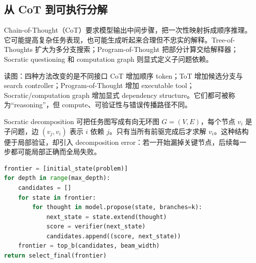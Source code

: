 \subsection{从 CoT 到可执行分解}

Chain-of-Thought（CoT）要求模型输出中间步骤，把一次性映射拆成顺序推理。它可能提高复杂任务表现，也可能生成听起来合理但不忠实的解释。Tree-of-Thoughts 扩大为多分支搜索；Program-of-Thought 把部分计算交给解释器；Socratic questioning 和 computation graph 则显式定义子问题依赖。





\begin{knowledgebox}{读图：四种方法改变的是不同接口}
CoT 增加顺序 token；ToT 增加候选分支与 search controller；Program-of-Thought 增加 executable tool；Socratic/computation graph 增加显式 dependency structure。它们都可被称为“reasoning”，但 compute、可验证性与错误传播路径不同。
\end{knowledgebox}

Socratic decomposition 可把任务图写成有向无环图 $G=(V,E)$，每个节点 $v_i$ 是子问题，边 $(v_j,v_i)$ 表示 $i$ 依赖 $j$。只有当所有前驱完成后才求解 $v_i$。这种结构便于局部验证，却引入 decomposition error：若一开始漏掉关键节点，后续每一步都可能局部正确而全局失败。




\begin{lstlisting}[language=Python,caption={带 verifier 的结构化推理搜索伪代码}]
frontier = [initial_state(problem)]
for depth in range(max_depth):
    candidates = []
    for state in frontier:
        for thought in model.propose(state, branches=k):
            next_state = state.extend(thought)
            score = verifier(next_state)
            candidates.append((score, next_state))
    frontier = top_b(candidates, beam_width)
return select_final(frontier)
\end{lstlisting}


